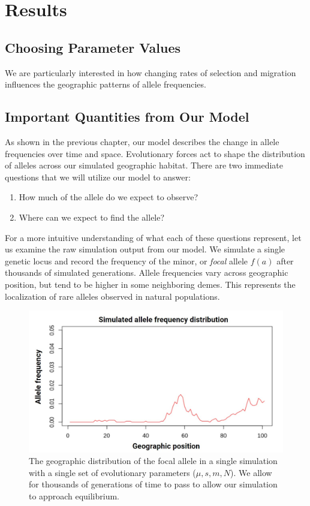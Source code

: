\chapter{Results}
\section{Choosing Parameter Values}
We are particularly interested in how changing rates of selection and migration influences the geographic patterns of allele frequencies. 



\section{Important Quantities from Our Model}
As shown in the previous chapter, our model describes the change in allele frequencies over time and space. Evolutionary forces act to shape the distribution of alleles across our simulated geographic habitat. There are two immediate questions that we will utilize our model to answer:

\begin{enumerate}
    \item How much of the allele do we expect to observe?
    \item Where can we expect to find the allele?
\end{enumerate}


For a more intuitive understanding of what each of these questions represent, let us examine the raw simulation output from our model. We simulate a single genetic locus and record the frequency of the minor, or \textit{focal} allele $f(a)$ after thousands of simulated generations. Allele frequencies vary across geographic position, but tend to be higher in some neighboring demes. This represents the localization of rare alleles observed in natural populations. \cite{1000_genomes} \cite{geerlings_2018} \cite{novembre_marcus_2017} 


\begin{figure}[h]
    \centering
    \includegraphics[scale=0.4]{img/geographic_distribution.JPG}
    \caption{The geographic distribution of the focal allele in a single simulation with a single set of evolutionary parameters ($\mu,s,m,N$). We allow for thousands of generations of time to pass to allow our simulation to approach equilibrium.}
    \label{fig:geog_sim}
\end{figure}


